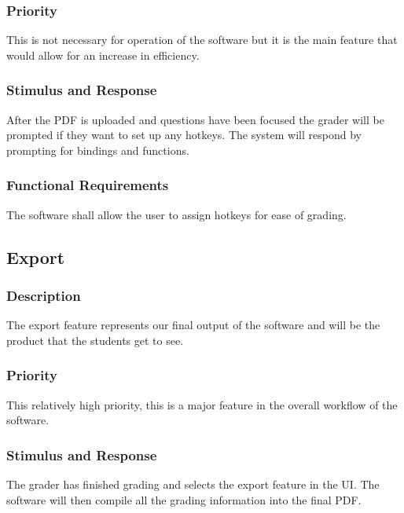 \subsubsection{Priority}
This is not necessary for operation of the software but it is the main feature that would allow for an increase in efficiency. 

\subsubsection{Stimulus and Response}
After the PDF is uploaded and questions have been focused the grader will be prompted if they want to set up any hotkeys. The system will respond by prompting for bindings and functions. 

\subsubsection{Functional Requirements}
The software shall allow the user to assign hotkeys for ease of grading.


\subsection{Export}
\subsubsection{Description}
The export feature represents our final output of the software and will be the product that the students get to see.


\subsubsection{Priority}
This relatively high priority, this is a major feature in the overall workflow of the software.

\subsubsection{Stimulus and Response}
The grader has finished grading and selects the export feature in the UI. The software will then compile all the grading information into the final PDF.

